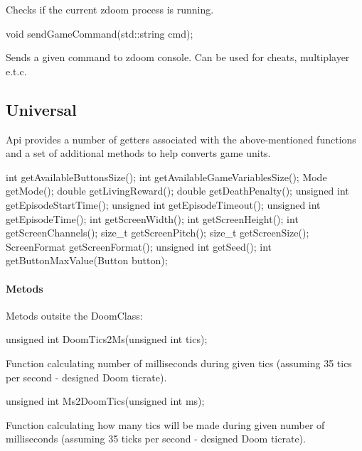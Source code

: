 Checks if the current zdoom process is running.


\vspace{20pt}
\begin{clinee}
	void sendGameCommand(std::string cmd);
\end{clinee}

Sends a given command to zdoom console. Can be used for cheats, multiplayer e.t.c.


\vspace{20pt}
\subsection{Universal}


Api provides a number of getters associated with the above-mentioned functions and a set of additional methods to help converts game units.
  

\vspace{20pt}
\begin{clinee}
int getAvailableButtonsSize();
int getAvailableGameVariablesSize();
Mode getMode();
double getLivingReward();
double getDeathPenalty();
unsigned int getEpisodeStartTime();
unsigned int getEpisodeTimeout();
unsigned int getEpisodeTime();
int getScreenWidth();
int getScreenHeight();
int getScreenChannels();
size_t getScreenPitch();
size_t getScreenSize();
ScreenFormat getScreenFormat();
unsigned int getSeed();
int getButtonMaxValue(Button button);
\end{clinee}


\paragraph {Metods} Metods outsite the DoomClass:


\begin{clinee}
unsigned int DoomTics2Ms(unsigned int tics);
\end{clinee}

Function calculating number of milliseconds during given tics (assuming 35 tics per second - designed Doom ticrate).


\vspace{20pt}
\begin{clinee}
unsigned int Ms2DoomTics(unsigned int ms);
\end{clinee}

Function calculating how many tics will be made during given number of milliseconds (assuming 35 ticks per second - designed Doom ticrate).


